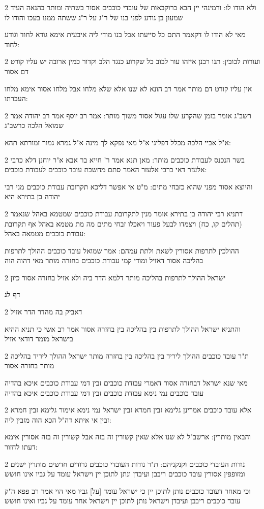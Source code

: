 \documentclass[12pt, openany]{book}
\newcommand{\sethebfont}{
\fontsize{10.5pt}{21.0pt} \selectfont
}
\newcommand{\twocol}[1]{
	{\sethebfont \begin{multicols}{2}
			#1
	\end{multicols}}	
}
\newcommand{\sectname}{}
\newcommand{\newsection}[1]{
	\addcontentsline{toc}{section}{#1}
	\renewcommand{\sectname}{#1}	
	\vspace{-\baselineskip}
	\begin{center}
		\textbf{%
\fontsize{16pt}{16pt}\selectfont
			#1}
	\end{center}
	\vspace{-\baselineskip}
	\nopagebreak
}
\begin{document}
\twocol{ולא הודו לו: ורמינהי יין הבא ברוקבאות של עובדי כוכבים אסור בשתיה ומותר בהנאה העיד שמעון בן גודע לפני בנו של ר"ג על ר"ג ששתה ממנו בעכו והודו לו
\par מאי לא הודו לו דקאמר התם כל סייעתו אבל בנו מודי ליה איבעית אימא גודא לחוד וגודע לחוד:}
\twocol{ועורות לבובין: תנו רבנן איזהו עור לבוב כל שקרוע כנגד הלב וקדור כמין ארובה יש עליו קורט דם אסור
\par אין עליו קורט דם מותר אמר רב הונא לא שנו אלא שלא מלחו אבל מלחו אסור אימא מלחו העברתו:}
\twocol{רשב"ג אומר בזמן שהקרע שלו עגול אסור משוך מותר: אמר רב יוסף אמר רב יהודה אמר שמואל הלכה כרשב"ג
\par א"ל אביי הלכה מכלל דפליגי א"ל מאי נפקא לך מינה א"ל גמרא גמור זמורתא תהא:}
\twocol{בשר הנכנס לעבודת כוכבים מותר: מאן תנא אמר ר' חייא בר אבא א"ר יוחנן דלא כרבי אלעזר דאי כרבי אלעזר האמר סתם מחשבת עובד כוכבים לעבודת כוכבים:
\par והיוצא אסור מפני שהוא כזבחי מתים: מ"ט אי אפשר דליכא תקרובת עבודת כוכבים מני רבי יהודה בן בתירא היא}
\twocol{דתניא רבי יהודה בן בתירא אומר מנין לתקרובת עבודת כוכבים שמטמא באהל שנאמר (תהלים קו, כח) ויצמדו לבעל פעור ויאכלו זבחי מתים מה מת מטמא באהל אף תקרובת עבודת כוכבים מטמאה באהל:
\par ההולכין לתרפות אסורין לשאת ולתת עמהם: אמר שמואל עובד כוכבים ההולך לתרפות בהליכה אסור דאזיל ומודי קמי עבודת כוכבים בחזרה מותר מאי דהוה הוה}
\twocol{ישראל ההולך לתרפות בהליכה מותר דלמא הדר ביה ולא אזיל בחזרה אסור כיון}
\newsection{דף לג}
\twocol{דאביק בה מהדר הדר אזיל
\par והתניא ישראל ההולך לתרפות בין בהליכה בין בחזרה אסור אמר רב אשי כי תניא ההיא בישראל מומר דודאי אזיל}
\twocol{ת"ר עובד כוכבים ההולך ליריד בין בהליכה בין בחזרה מותר ישראל ההולך ליריד בהליכה מותר בחזרה אסור
\par מאי שנא ישראל דבחזרה אסור דאמרי עבודת כוכבים זבין דמי עבודת כוכבים איכא בהדיה עובד כוכבים נמי נימא עבודת כוכבים זבין דמי עבודת כוכבים איכא בהדיה}
\twocol{אלא עובד כוכבים אמרינן גלימא זבין חמרא זבין ישראל נמי נימא אימור גלימא זבין חמרא זבין אי איתא דה"ל הכא הוה מזבין ליה:
\par והבאין מותרין: ארשב"ל לא שנו אלא שאין קשורין זה בזה אבל קשורין זה בזה אסורין אימא דעתו לחזור:}
\twocol{נודות העובדי כוכבים וקנקניהם: ת"ר נודות העובדי כוכבים גרודים חדשים מותרין ישנים ומזופפין אסורין עובד כוכבים ריבבן ועיבדן ונתן לתוכן יין וישראל עומד על גביו אינו חושש
\par וכי מאחר דעובד כוכבים נותן לתוכן יין כי ישראל עומד [על] גביו מאי הוי אמר רב פפא ה"ק עובד כוכבים ריבבן ועיבדן וישראל נותן לתוכן יין וישראל אחר עומד על גביו ואינו חושש}
\end{document}
